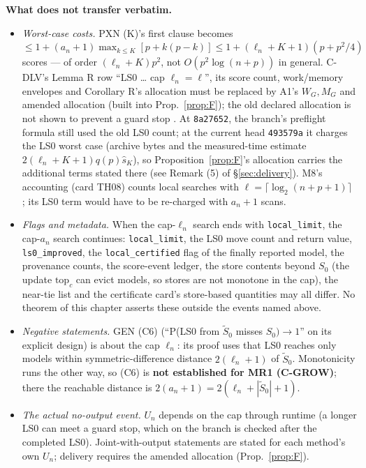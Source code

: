 \textbf{What does not transfer verbatim.}
\begin{itemize}
\item \emph{Worst-case costs.} PXN (K)'s first clause becomes $\le1+(a_n+1)\max_{k\le K}[p+k(p-k)]\le1+(\ell_n+K+1)(p+p^2/4)$ scores — of order $(\ell_n+K)p^2$, not $O(p^2\log(n+p))$ in general. C-DLV's Lemma R row ``LS0 \ldots{} cap $\ell_n=\ell$'', its score count, work/memory envelopes and Corollary R's allocation must be replaced by A1's $W_G,M_G$ and amended allocation (built into Prop.~\ref{prop:F}); the old declared allocation is not shown to prevent a guard stop . At \texttt{8a27652}, the branch's preflight formula still used the old LS0 count; at the current head \texttt{493579a} it charges the LS0 worst case (archive bytes and the measured-time estimate $2(\ell_n+K+1)q(p)\hat s_K$), so Proposition~\ref{prop:F}'s allocation carries the additional terms stated there (see Remark (5) of §\ref{sec:delivery}). M8's accounting (card TH08) counts local searches with $\ell=\lceil\log_2(n+p+1)\rceil$ ; its LS0 term would have to be re-charged with $a_n+1$ scans.
\item \emph{Flags and metadata.} When the cap-$\ell_n$ search ends with \texttt{local\_limit}, the cap-$a_n$ search continues: \texttt{local\_limit}, the LS0 move count and return value, \texttt{ls0\_improved}, the \texttt{local\_certified} flag of the finally reported model, the provenance counts, the score-event ledger, the store contents beyond $S_0$ (the update $\mathrm{top}_c$ can evict models, so stores are not monotone in the cap), the near-tie list and the certificate card's store-based quantities may all differ. No theorem of this chapter asserts these outside the events named above.
\item \emph{Negative statements.} GEN (C6) (``P(LS0 from $\tilde{S}_0$ misses $S_0)\to1$'' on its explicit design) is about the cap $\ell_n$: its proof uses that LS0 reaches only models within symmetric-difference distance $2(\ell_n+1)$ of $\tilde{S}_0$. Monotonicity runs the other way, so (C6) is \textbf{not established for MR1 (C-GROW)}; there the reachable distance is $2(a_n+1)=2(\ell_n+|\tilde{S}_0|+1)$.
\item \emph{The actual no-output event.} $U_n$ depends on the cap through runtime (a longer LS0 can meet a guard stop, which on the branch is checked after the completed LS0). Joint-with-output statements are stated for each method's own $U_n$; delivery requires the amended allocation (Prop.~\ref{prop:F}).
\end{itemize}
